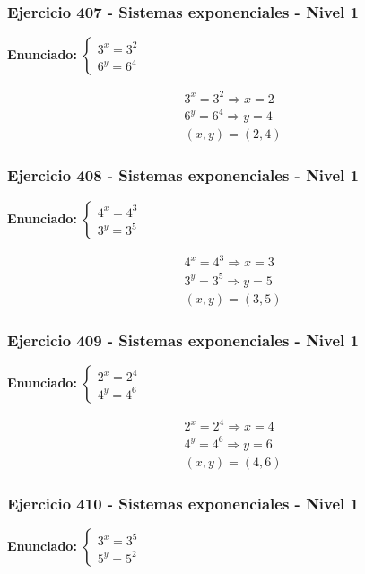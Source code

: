 \documentclass[12pt,a4paper]{article}
\begin{document}
\subsubsection*{Ejercicio 407 - Sistemas exponenciales - Nivel 1}
\textbf{Enunciado:} \(\begin{cases} 3^x=3^{2}\\ 6^y=6^{4}\end{cases}\)

\[
\begin{aligned}
3^x=3^{2}\Rightarrow x=2\\
6^y=6^{4}\Rightarrow y=4\\
\boxed{(x,y)=(2,4)}
\end{aligned}
\]


\subsubsection*{Ejercicio 408 - Sistemas exponenciales - Nivel 1}
\textbf{Enunciado:} \(\begin{cases} 4^x=4^{3}\\ 3^y=3^{5}\end{cases}\)

\[
\begin{aligned}
4^x=4^{3}\Rightarrow x=3\\
3^y=3^{5}\Rightarrow y=5\\
\boxed{(x,y)=(3,5)}
\end{aligned}
\]


\subsubsection*{Ejercicio 409 - Sistemas exponenciales - Nivel 1}
\textbf{Enunciado:} \(\begin{cases} 2^x=2^{4}\\ 4^y=4^{6}\end{cases}\)

\[
\begin{aligned}
2^x=2^{4}\Rightarrow x=4\\
4^y=4^{6}\Rightarrow y=6\\
\boxed{(x,y)=(4,6)}
\end{aligned}
\]


\subsubsection*{Ejercicio 410 - Sistemas exponenciales - Nivel 1}
\textbf{Enunciado:} \(\begin{cases} 3^x=3^{5}\\ 5^y=5^{2}\end{cases}\)
\end{document}
